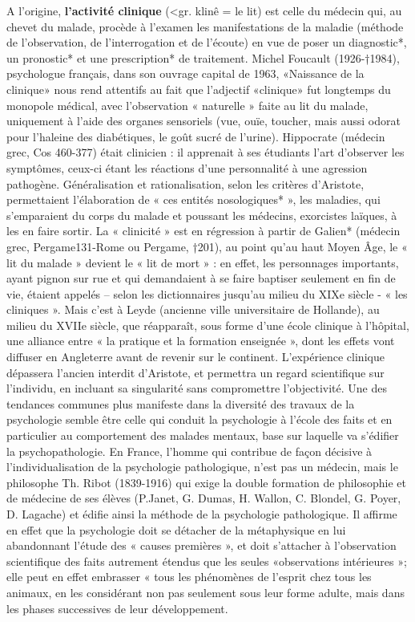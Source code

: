 A l’origine,\textbf{ l’activité clinique} (<gr. klinê = le lit) est celle du médecin qui, au chevet du malade, procède à l’examen les manifestations de la maladie (méthode de l’observation, de l’interrogation et de l’écoute) en vue de poser un diagnostic*, un pronostic* et une prescription* de traitement.
Michel Foucault (1926-†1984), psychologue français, dans son ouvrage capital de 1963,
«Naissance de la clinique» nous rend attentifs au fait que l’adjectif «clinique» fut longtemps du monopole médical, avec l’observation « naturelle » faite au lit du malade, uniquement à l’aide des organes sensoriels (vue, ouïe, toucher, mais aussi odorat pour l’haleine des diabétiques, le goût sucré de l’urine).
Hippocrate (médecin grec, Cos 460-377) était clinicien : il apprenait à ses étudiants l’art d’observer les symptômes, ceux-ci étant les réactions d’une personnalité à une agression pathogène. Généralisation et rationalisation, selon les critères d’Aristote, permettaient l’élaboration de « ces entités nosologiques* », les maladies, qui s’emparaient du corps du malade et poussant les médecins, exorcistes laïques, à les en faire sortir.
La « clinicité » est en régression à partir de Galien* (médecin grec, Pergame131-Rome ou Pergame, †201), au point qu’au haut Moyen Âge, le « lit du malade » devient le « lit de mort » : en effet, les personnages importants, ayant pignon sur rue et qui demandaient à se
faire baptiser seulement en fin de vie, étaient appelés – selon les dictionnaires jusqu’au milieu du XIXe siècle - « les cliniques ».
Mais c’est à Leyde (ancienne ville universitaire de Hollande), au milieu du XVIIe siècle, que réapparaît, sous forme d’une école clinique à l’hôpital, une alliance entre « la pratique et la formation enseignée », dont les effets vont diffuser en Angleterre avant de revenir sur le continent. L’expérience clinique dépassera l’ancien interdit d’Aristote, et permettra un regard scientifique sur l’individu, en incluant sa singularité sans compromettre l’objectivité.
Une des tendances communes plus manifeste dans la diversité des travaux de la psychologie semble être celle qui conduit la psychologie à l’école des faits et en particulier au comportement des malades mentaux, base sur laquelle va s’édifier la psychopathologie.
En France, l’homme qui contribue de façon décisive à l’individualisation de la psychologie pathologique, n’est pas un médecin, mais le philosophe Th. Ribot (1839-1916) qui exige la double formation de philosophie et de médecine de ses élèves (P.Janet, G. Dumas, H. Wallon, C. Blondel, G. Poyer, D. Lagache) et édifie ainsi la méthode de la psychologie pathologique. Il affirme en effet que la psychologie doit se détacher de la métaphysique en lui abandonnant l’étude des « causes premières », et doit s’attacher à l’observation scientifique des faits autrement étendus que les seules «observations intérieures »; elle peut en effet embrasser « tous les phénomènes de l’esprit chez tous les animaux, en les considérant non pas seulement sous leur forme adulte, mais dans les phases successives de leur développement.
